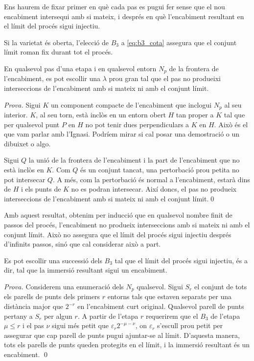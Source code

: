 Ens haurem de fixar primer en què cada pas es pugui fer sense que el nou encabiment intersequi amb si mateix, i després en què l'encabiment resultant en el límit del procés sigui injectiu.
\begin{obs}
    Si la varietat és oberta, l'elecció de $B_3$ a \ref{eq:b3_cota} assegura que el conjunt límit roman fix durant tot el procés.
\end{obs}
\begin{prop}
    En qualsevol pas d'una etapa i en qualsevol entorn $N_p$ de la frontera de l'encabiment, es pot escollir una $\lambda$ prou gran tal que el pas no produeixi interseccions de l'encabiment amb si mateix ni amb el conjunt límit.
\end{prop}
{
\color{green!50!black} \textit{Prova.} 
    Sigui $K$ un component compacte de l'encabiment que inclogui $N_p$ al seu interior. $K$, al seu torn, està inclòs en un entorn obert $H$ tan proper a $K$ tal que per qualsevol punt $P$ en $H$ no pot tenir dues perpendiculars a $K$ en $H$. {\color{blue} Això és el que vam parlar amb l'Ignasi. Podríem mirar si cal posar una demostració o un dibuixet o algo.}

    Sigui $Q$ la unió de la frontera de l'encabiment i la part de l'encabiment que no està inclòs en $K$. Com $Q$ és un conjunt tancat, una pertorbació prou petita no pot intersecar $Q$. A més, com la pertorbació és normal a l'encabiment, estarà dins de $H$ i els punts de $K$ no es podran intersecar. Així doncs, el pas no produeix interseccions de l'encabiment amb si mateix ni amb el conjunt límit.\qed
}

Amb aquest resultat, obtenim per inducció que en qualsevol nombre finit de passos del procés, l'encabiment no produeix interseccions amb si mateix ni amb el conjunt límit. Això no assegura que el límit del procés sigui injectiu després d'infinits passos, sinó que cal considerar això a part.

\begin{prop}
    Es pot escollir una successió dels $B_3$ tal que el límit del procés sigui injectiu, és a dir, tal que la immersió resultant sigui un encabiment.
\end{prop}
{
\color{green!50!black} \textit{Prova.} 
    Considerem una enumeració dels $N_p$ qualsevol. Sigui $S_r$ el conjunt de tots els parells de punts dels primers $r$ entorns tals que estaven separats per una distància major que $2^{-r}$ en l'encabiment curt original. Qualsevol parell de punts pertany a $S_r$ per algun $r$. A partir de l'etapa $r$ requerirem que el $B_3$ de l'etapa $\mu\le r$ i el pas $\nu$ sigui més petit que $\varepsilon_r2^{-\mu-\nu}$, on $\varepsilon_r$ s'escull prou petit per assegurar que cap parell de punts pugui ajuntar-se al límit. D'aquesta manera, tots els parells de punts queden protegits en el límit, i la immersió resultant és un encabiment. \qed
}
